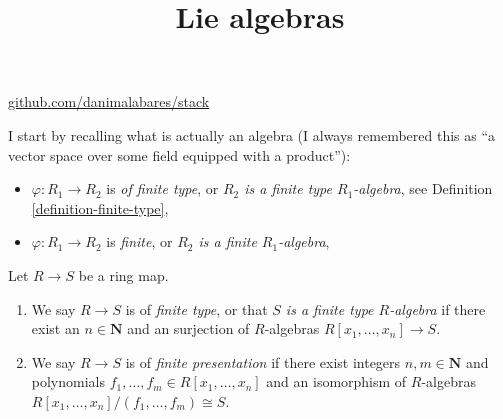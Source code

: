 



\title{Lie algebras}
\maketitle

\label{section-phantom}
\hfill
\href{http://github.com/danimalabares/stack}{github.com/danimalabares/stack}

\tableofcontents

I start by recalling what is actually an algebra (I always remembered this as
``a vector space over some field equipped with a product''):

\begin{itemize}
\label{item-ring-homomorphism-finite-presentation}
$\varphi : R_1 \to R_2$ is {\it of finite presentation}, or
{\it $R_2$ is a finitely presented $R_1$-algebra},
see Definition \ref{definition-finite-type},
\item
\label{item-ring-homomorphism-finite-type}
$\varphi : R_1 \to R_2$ is {\it of finite type}, or
{\it $R_2$ is a finite type $R_1$-algebra},
see Definition \ref{definition-finite-type},
\item
\label{item-ring-homomorphism-finite}
$\varphi : R_1 \to R_2$ is {\it finite}, or
{\it $R_2$ is a finite $R_1$-algebra},
\end{itemize}

\begin{definition}
\label{definition-finite-type}
Let $R \to S$ be a ring map.
\begin{enumerate}
\item We say $R \to S$ is of {\it finite type}, or that {\it $S$ is a finite
type $R$-algebra} if there exist an $n \in \mathbf{N}$ and an surjection
of $R$-algebras $R[x_1, \ldots, x_n] \to S$.
\item We say $R \to S$ is of {\it finite presentation} if there
exist integers $n, m \in \mathbf{N}$ and polynomials
$f_1, \ldots, f_m \in R[x_1, \ldots, x_n]$
and an isomorphism of $R$-algebras
$R[x_1, \ldots, x_n]/(f_1, \ldots, f_m) \cong S$.
\end{enumerate}
\end{definition}








